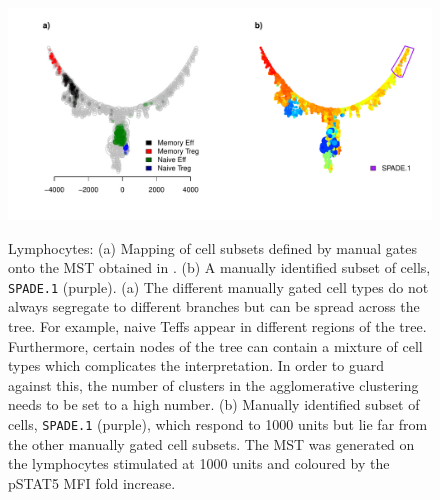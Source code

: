 \begin{figure}
\centering
\begin{minipage}{\textwidth}
\includegraphics[width=\linewidth]{figures/spade-lymphocytes-celltypes}
\end{minipage}
{ Lymphocytes: (a) Mapping of cell subsets defined by manual gates onto the \gls{MST} obtained in .  (b) A manually identified subset of cells, \texttt{SPADE.1} (purple). }
{ (a)
The different manually gated cell types do not always segregate to different branches but can be spread across the tree.
For example, naive Teffs appear in different regions of the tree.
Furthermore, certain nodes of the tree can contain a mixture of cell types which complicates the interpretation.
In order to guard against this, the number of clusters in the agglomerative clustering needs to be set to a high number.
(b)
Manually identified subset of cells, \texttt{SPADE.1} (purple), which respond to 1000 units but lie far from the other manually gated cell subsets.
The \gls{MST} was generated on the lymphocytes stimulated at 1000 units and coloured by the pSTAT5 MFI fold increase.
}
\end{figure}

